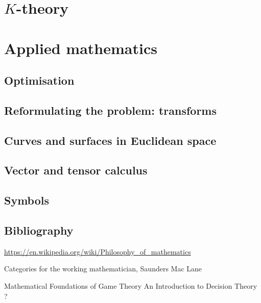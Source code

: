 \documentclass{report}
\begin{document}
\part{$K$-theory}
\setcounter{chapter}{0} %



\part{Applied mathematics}
\setcounter{chapter}{0} %
\chapter{Optimisation}


\chapter{Reformulating the problem: transforms}




\chapter{Curves and surfaces in Euclidean space}

\chapter{Vector and tensor calculus}





\appendix

\chapter{Symbols}


\listoftheorems[title={List of named results}, swapnumber,ignoreall,onlynamed]



\chapter{Bibliography}

\url{https://en.wikipedia.org/wiki/Philosophy_of_mathematics}

Categories for the working mathematician, Saunders Mac Lane

Mathematical Foundations of Game Theory
An Introduction to Decision Theory ?
\end{document}
